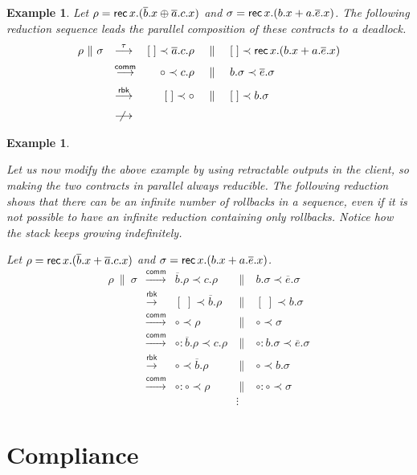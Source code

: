 \documentclass[UKenglish]{eptcs}
\newtheorem{example}[definition]{Example}
\newcommand{\cons}{\!:\!}
\newcommand{\ored}[1]{\stackrel{#1}{\longrightarrow}}      \newcommand{\Ored}[1]{\stackrel{#1}{\Longrightarrow}}
\newcommand{\CommRule}{\textsf{comm}}
\newcommand{\RbkRule}{\textsf{rbk}}
\newcommand{\Dual}[1]{\overline{#1}}
\newcommand{\rec}{{\sf rec} \, }
\newcommand{\emptystack}{[\;]}
\newcommand{\back}{\prec}
\newcommand{\np}[2]{#1\back#2}
\newcommand{\pp}{~\|~}
\begin{document}
\begin{example}\label{exampleRed1}
{\em
Let $\rho = \rec x.(\Dual{b}.x \oplus \Dual{a}.c.x)$ and  
     $\sigma = {\rec x.(b.x + a.\Dual{e}.x)}$. The following reduction sequence leads the parallel composition of these contracts to a deadlock.
 \[\begin{array}{llrcl}
\rho\pp\sigma&
 \ored{\tau} &
	\np{\emptystack}{\Dual{a}.c.\rho}
& \pp &\np{\emptystack}{\rec x.(b.x + a.\Dual{e}.x)}\\[2mm]
&\ored{\CommRule} &
	\np{\circ}{c.\rho}
& \pp & \np{b.\sigma }{\Dual{e}.\sigma}\\[2mm]
&
 \ored{\RbkRule } &
	\np{\emptystack}{\circ}
& \pp & \np{\emptystack }{b.\sigma }\\[2mm]
&
\,\,\not\!\!\ored{ } 
\end{array}\]
}
\end{example}

\begin{example}\label{exampleRed2}
{\em
Let us now modify the above example by using retractable outputs in the client, so making the two contracts in parallel always reducible. The following reduction shows that there can be an infinite number of  rollbacks in a sequence, even if it is not possible to have an infinite reduction
containing only rollbacks.
Notice how the stack keeps growing indefinitely.

\noindent
Let $\rho = \rec x.(\Dual{b}.x + \Dual{a}.c.x)$ and  
     $\sigma = {\rec x.(b.x + a.\Dual{e}.x)}$.
\[\begin{array}{llrcl}
  \rho\pp\sigma& \ored{\CommRule} &
	\np{\Dual{b}.\rho}{c.\rho}
& \pp &\np{b.\sigma}{\Dual{e}.\sigma}\\[2mm]
&
 \ored{ \RbkRule} &
	\np{\emptystack}{\Dual{b}.\rho}
& \pp & \np{\emptystack }{b.\sigma}\\[2mm]
&
 \ored{\CommRule } &
	\np{\circ}{\rho}
& \pp & \np{ \circ}{\sigma}\\[2mm]
&
 \ored{\CommRule} &
	\np{\circ\cons \Dual{b}.\rho}{c.\rho}
& \pp &\np{\circ\cons b.\sigma}{\Dual{e}.\sigma}\\[2mm]
&
 \ored{ \RbkRule} &
	\np{\circ}{\Dual{b}.\rho}
& \pp & \np{\circ }{b.\sigma}\\[2mm]
&
 \ored{\CommRule } &
	\np{\circ\cons\circ}{\rho}
& \pp & \np{ \circ\cons\circ}{\sigma}\\[2mm]
&
  & 
	 & \vdots
\end{array}\]
}
\end{example}

\section{Compliance}
\end{document}
